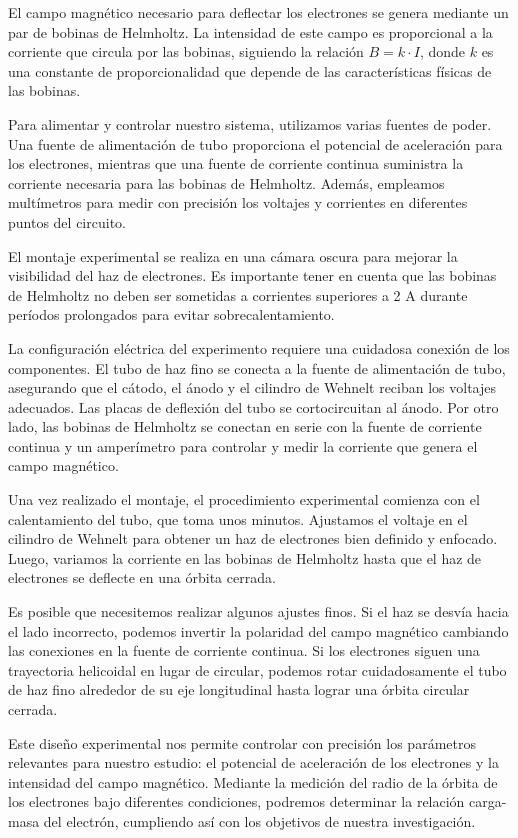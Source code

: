 \documentclass[twocolumn,a4paper,11pt]{scrartcl}
\begin{document}
El campo magnético necesario para deflectar los electrones se genera mediante un par de bobinas de Helmholtz. La intensidad de este campo es proporcional a la corriente que circula por las bobinas, siguiendo la relación $B = k \cdot I$, donde $k$ es una constante de proporcionalidad que depende de las características físicas de las bobinas.

Para alimentar y controlar nuestro sistema, utilizamos varias fuentes de poder. Una fuente de alimentación de tubo proporciona el potencial de aceleración para los electrones, mientras que una fuente de corriente continua suministra la corriente necesaria para las bobinas de Helmholtz. Además, empleamos multímetros para medir con precisión los voltajes y corrientes en diferentes puntos del circuito.

El montaje experimental se realiza en una cámara oscura para mejorar la visibilidad del haz de electrones. Es importante tener en cuenta que las bobinas de Helmholtz no deben ser sometidas a corrientes superiores a 2 A durante períodos prolongados para evitar sobrecalentamiento.

La configuración eléctrica del experimento requiere una cuidadosa conexión de los componentes. El tubo de haz fino se conecta a la fuente de alimentación de tubo, asegurando que el cátodo, el ánodo y el cilindro de Wehnelt reciban los voltajes adecuados. Las placas de deflexión del tubo se cortocircuitan al ánodo. Por otro lado, las bobinas de Helmholtz se conectan en serie con la fuente de corriente continua y un amperímetro para controlar y medir la corriente que genera el campo magnético.

Una vez realizado el montaje, el procedimiento experimental comienza con el calentamiento del tubo, que toma unos minutos. Ajustamos el voltaje en el cilindro de Wehnelt para obtener un haz de electrones bien definido y enfocado. Luego, variamos la corriente en las bobinas de Helmholtz hasta que el haz de electrones se deflecte en una órbita cerrada.

Es posible que necesitemos realizar algunos ajustes finos. Si el haz se desvía hacia el lado incorrecto, podemos invertir la polaridad del campo magnético cambiando las conexiones en la fuente de corriente continua. Si los electrones siguen una trayectoria helicoidal en lugar de circular, podemos rotar cuidadosamente el tubo de haz fino alrededor de su eje longitudinal hasta lograr una órbita circular cerrada.

Este diseño experimental nos permite controlar con precisión los parámetros relevantes para nuestro estudio: el potencial de aceleración de los electrones y la intensidad del campo magnético. Mediante la medición del radio de la órbita de los electrones bajo diferentes condiciones, podremos determinar la relación carga-masa del electrón, cumpliendo así con los objetivos de nuestra investigación.
\end{document}
